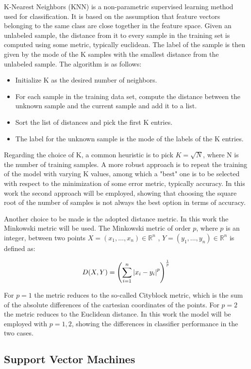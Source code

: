 \documentclass[journal,twocolumn]{IEEEtran}
\begin{document}
K-Nearest Neighbors (KNN) is a non-parametric supervised learning method used for classification. It is based on the assumption that feature vectors belonging to the same class are close
together in the feature space. Given an unlabeled sample,
the distance from it to every sample in the training set is
computed using some metric, typically euclidean. The label
of the sample is then given by the mode of the K samples
with the smallest distance from the unlabeled sample. The
algorithm is as follows:
\begin{itemize}
\item Initialize K as the desired number of neighbors.
\item For each sample in the training data set, compute the
distance between the unknown sample and the current
sample and add it to a list.
\item Sort the list of distances and pick the first K entries.
\item The label for the unknown sample is the mode of the
labels of the K entries.
\end{itemize}
Regarding
the choice of K, a common heuristic is to pick $K=\sqrt{N}$, where N is the number of training samples. A more robust approach is to repeat the training of the model
with varying K values, among which a "best" one is to be
selected with respect to the minimization of some error metric, typically accuracy. In this work the second approach will be employed, showing that choosing the square root of the number of samples is not always the best option in terms of accuracy.

Another choice to be made is the adopted distance metric. In
this work the Minkowski metric will be used. The Minkowski
metric of order $p$, where $p$ is an integer, between two points $X=(x_1,\dots,x_n)\in\mathbb{R}^n$ , $Y=(y_1,\dots,y_n) \in\mathbb{R}^n$ is defined
as:

\begin{equation*}
D(X,Y)=\left(\sum\limits_{i=1}^n\abs{x_i-y_i}^p\right)^{\frac{1}{p}}
\end{equation*}

For $p=1$ the metric reduces to the so-called Cityblock metric, which is the sum of the absolute differences of the cartesian coordinates of the points. For $p=2$ the metric reduces to the Euclidean distance. In this work the model will be employed with $p=1,2$, showing the differences in classifier performance in the two cases.

\subsection{Support Vector Machines}
\end{document}
